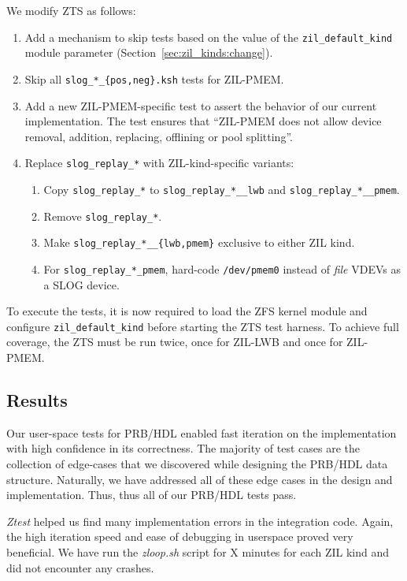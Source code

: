 \documentclass[12pt,a4paper,twoside]{book}
\begin{document}
We modify ZTS as follows:
\begin{enumerate}[noitemsep]
    \item Add a mechanism to skip tests based on the value of the \lstinline{zil_default_kind} module parameter (Section~\ref{sec:zil_kinds:change}).
    \item Skip all \lstinline|slog_*_{pos,neg}.ksh| tests for ZIL-PMEM.
    \item Add a new ZIL-PMEM-specific test to assert the behavior of our current implementation.
        The test ensures that ``ZIL-PMEM does not allow device removal, addition, replacing, offlining or pool splitting''.
    \item Replace \lstinline{slog_replay_*} with ZIL-kind-specific variants:
        \begin{enumerate}
            \item Copy \lstinline{slog_replay_*} to \lstinline{slog_replay_*__lwb} and \lstinline{slog_replay_*__pmem}.
            \item Remove \lstinline{slog_replay_*}.
            \item Make \lstinline|slog_replay_*__{lwb,pmem}| exclusive to either ZIL kind.
            \item For \lstinline{slog_replay_*_pmem}, hard-code \lstinline{/dev/pmem0} instead of \textit{file} VDEVs as a SLOG device.
        \end{enumerate}
\end{enumerate}
To execute the tests, it is now required to load the ZFS kernel module and configure \lstinline{zil_default_kind} before starting the ZTS test harness.
To achieve full coverage, the ZTS must be run twice, once for ZIL-LWB and once for ZIL-PMEM.

\subsection{Results}

Our user-space tests for PRB/HDL enabled fast iteration on the implementation with high confidence in its correctness.
The majority of test cases are the collection of edge-cases that we discovered while designing the PRB/HDL data structure.
Naturally, we have addressed all of these edge cases in the design and implementation.
Thus, thus all of our PRB/HDL tests pass.

\textit{Ztest} helped us find many implementation errors in the integration code.
Again, the high iteration speed and ease of debugging in userspace proved very beneficial.
We have run the \textit{zloop.sh} script for X minutes for each ZIL kind and did not encounter any crashes.
\end{document}
